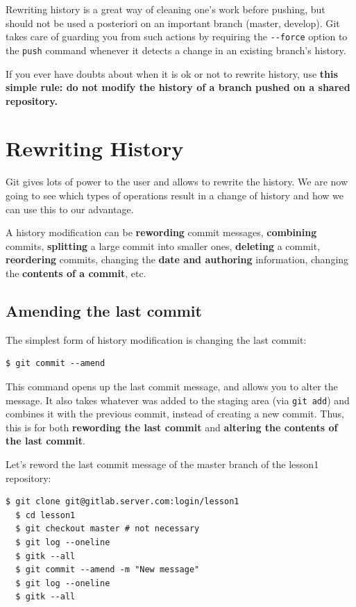 \documentclass[a4paper]{../../common/tufte-latex/tufte-handout}
\begin{document}
Rewriting history is a great way of cleaning one's work before pushing, but should not be used a posteriori on an important branch (master, develop).
Git takes care of guarding you from such actions by requiring the \texttt{-{}-force} option to the \texttt{push} command whenever it detects a change in an existing branch's history.

If you ever have doubts about when it is ok or not to rewrite history, use \textbf{this simple rule: do not modify the history of a branch pushed on a shared repository.}

\section{Rewriting History}
Git gives lots of power to the user and allows to rewrite the history.
We are now going to see which types of operations result in a change of history and how we can use this to our advantage.

A history modification can be \textbf{rewording} commit messages, \textbf{combining} commits, \textbf{splitting} a large commit into smaller ones, \textbf{deleting} a commit, \textbf{reordering} commits, changing the \textbf{date and authoring} information, changing the \textbf{contents of a commit}, etc.

\subsection{Amending the last commit}
The simplest form of history modification is changing the last commit:

\begin{lstlisting}[style=BashInputStyle]
  $ git commit --amend
\end{lstlisting}

This command opens up the last commit message, and allows you to alter the message.
It also takes whatever was added to the staging area (via \texttt{git add}) and combines it with the previous commit, instead of creating a new commit.
Thus, this is for both \textbf{rewording the last commit} and \textbf{altering the contents of the last commit}.

Let's reword the last commit message of the master branch of the lesson1 repository:

\begin{lstlisting}[style=BashInputStyle]
  $ git clone git@gitlab.server.com:login/lesson1
  $ cd lesson1
  $ git checkout master # not necessary
  $ git log --oneline
  $ gitk --all
  $ git commit --amend -m "New message"
  $ git log --oneline
  $ gitk --all
\end{lstlisting}
\end{document}

